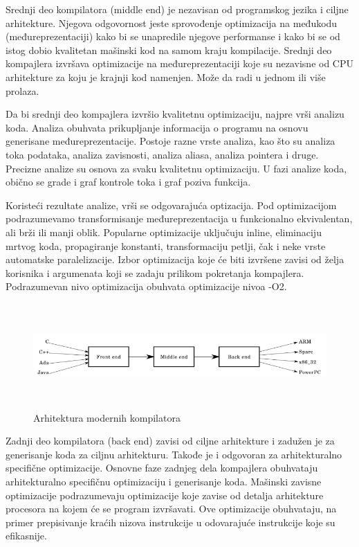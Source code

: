 \documentclass[12pt,oneside]{memoir}
\begin{document}
Srednji deo kompilatora (middle end) je nezavisan od programskog jezika i ciljne arhitekture. Njegova odgovornost jeste sprovođenje optimizacija na međukodu (međureprezentaciji) kako bi se unapredile njegove performanse i kako bi se od istog dobio kvalitetan mašinski kod na samom kraju kompilacije. Srednji deo kompajlera izvršava optimizacije na međureprezentaciji koje su
nezavisne od CPU arhitekture za koju je krajnji kod namenjen. Može da radi u jednom ili više prolaza.

Da bi srednji deo kompajlera izvršio kvalitetnu optimizaciju, najpre vrši analizu koda.
Analiza obuhvata prikupljanje informacija o programu na osnovu generisane
međureprezentacije. Postoje razne vrste analiza, kao što su analiza toka podataka, analiza 
zavisnosti, analiza aliasa, analiza pointera i druge. Precizne analize su osnova za svaku 
kvalitetnu optimizaciju. U fazi analize koda, obično se grade i graf kontrole toka i graf poziva 
funkcija.

Koristeći rezultate analize, vrši se odgovarajuća optizacija.
Pod optimizacijom podrazumevamo transformisanje međureprezentacija u funkcionalno
ekvivalentan, ali brži ili manji oblik. Popularne optimizacije uključuju inline, eliminaciju mrtvog koda, propagiranje konstanti, transformaciju petlji, čak i neke vrste automatske paralelizacije. Izbor optimizacija koje će biti izvršene zavisi od želja korisnika i argumenata koji se zadaju prilikom pokretanja kompajlera. Podrazumevan nivo optimizacija obuhvata optimizacije nivoa -O2.

\begin{figure}
\includegraphics[width=\textwidth, height=4cm]{frontmidback}
\caption{Arhitektura modernih kompilatora}
\centering
\end{figure}

Zadnji deo kompilatora (back end) zavisi od ciljne arhitekture i zadužen je za generisanje koda za ciljnu arhitekturu. Takođe je i odgovoran za arhitekturalno specifične optimizacije. Osnovne faze zadnjeg dela kompajlera obuhvataju arhitekturalno specifičnu optimizaciju i 
generisanje koda. Mašinski zavisne optimizacije podrazumevaju optimizacije koje zavise od detalja 
arhitekture procesora na kojem će se program izvršavati. Ove optimizacije 
obuhvataju, na primer prepisivanje kraćih nizova instrukcije u odovarajuće 
instrukcije koje su efikasnije.
\end{document}
